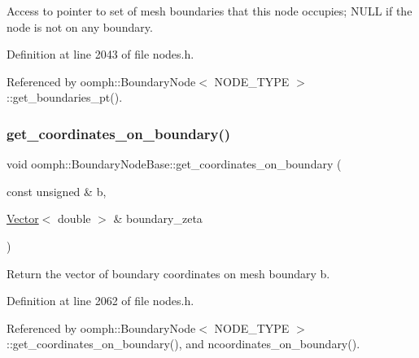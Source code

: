 Access to pointer to set of mesh boundaries that this node occupies; N\+U\+LL if the node is not on any boundary. 



Definition at line 2043 of file nodes.\+h.



Referenced by oomph\+::\+Boundary\+Node$<$ N\+O\+D\+E\+\_\+\+T\+Y\+P\+E $>$\+::get\+\_\+boundaries\+\_\+pt().

\mbox{\label{classoomph_1_1BoundaryNodeBase_a4c0397f720292ff195f32332f284cd8f}} 
\subsubsection{\texorpdfstring{get\+\_\+coordinates\+\_\+on\+\_\+boundary()}{get\_coordinates\_on\_boundary()}\hspace{0.1cm}{\footnotesize\ttfamily [1/2]}}
{\footnotesize\ttfamily void oomph\+::\+Boundary\+Node\+Base\+::get\+\_\+coordinates\+\_\+on\+\_\+boundary (\begin{DoxyParamCaption}\item[{const unsigned \&}]{b,  }\item[{\hyperlink{classoomph_1_1Vector}{Vector}$<$ double $>$ \&}]{boundary\+\_\+zeta }\end{DoxyParamCaption})\hspace{0.3cm}{\ttfamily [inline]}}



Return the vector of boundary coordinates on mesh boundary b. 



Definition at line 2062 of file nodes.\+h.



Referenced by oomph\+::\+Boundary\+Node$<$ N\+O\+D\+E\+\_\+\+T\+Y\+P\+E $>$\+::get\+\_\+coordinates\+\_\+on\+\_\+boundary(), and ncoordinates\+\_\+on\+\_\+boundary().

\mbox{\label{classoomph_1_1BoundaryNodeBase_a6dd015b923a309292616805a658eb401}} 
